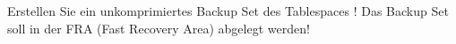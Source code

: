     \item Erstellen Sie ein unkomprimiertes Backup Set des Tablespaces
    ! Das Backup Set soll in der FRA (Fast Recovery Area)
    abgelegt werden!
